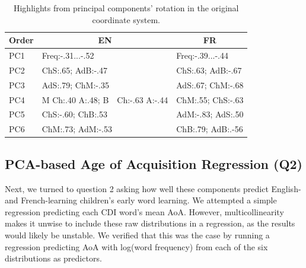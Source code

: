 \documentclass[10pt, letterpaper]{article}
\newenvironment{CodeChunk}{}{}
\begin{document}
\begin{CodeChunk}



\begin{table}[tbp]

\begin{center}
\begin{threeparttable}

\caption{\label{tab:unnamed-chunk-2}Highlights from principal components' rotation in the original coordinate system.}

\begin{tabular}{lll}
\toprule
Order & \multicolumn{1}{c}{EN} & \multicolumn{1}{c}{FR}\\
\midrule
PC1 & Freq:-.31...-.52 & Freq:-.39...-.44\\
PC2 & ChS:.65; AdB:-.47 & ChS:.63; AdB:-.67\\
PC3 & AdS:.79; ChM:-.35 & AdS:.67; ChM:-.68\\
PC4 & M Ch:.40 A:.48; B\ \ Ch:-.63 A:-.44 & ChM:.55; ChS:-.63\\
PC5 & ChS:-.60; ChB:.53 & AdM:-.83; AdS:.50\\
PC6 & ChM:.73; AdM:-.53 & ChB:.79; AdB:.-56\\
\bottomrule
\end{tabular}

\end{threeparttable}
\end{center}

\end{table}


\end{CodeChunk}

\hypertarget{pca-based-age-of-acquisition-regression-q2}{%
\subsection{PCA-based Age of Acquisition Regression
(Q2)}\label{pca-based-age-of-acquisition-regression-q2}}

Next, we turned to question 2 asking how well these components predict
English- and French-learning children's early word learning. We
attempted a simple regression predicting each CDI word's mean AoA.
However, multicollinearity makes it unwise to include these raw
distributions in a regression, as the results would likely be unstable.
We verified that this was the case by running a regression predicting
AoA with log(word frequency) from each of the six distributions as
predictors.
\end{document}
